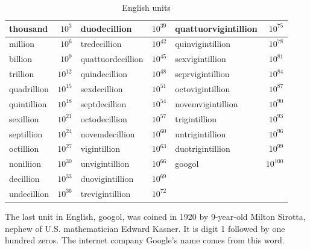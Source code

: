 \documentclass[b5paper]{article}
\begin{document}
\begin{table}[htbp]
  \centering
  \begin{tabular}{|l|r|l|r|l|r|}
  \hline
  thousand & $10^{3}$ & duodecillion  & $10^{39}$ & quattuorvigintillion & $10^{75}$ \\
  \hline
  million & $10^{6}$ & tredecillion  & $10^{42}$ & quinvigintillion & $10^{78}$ \\
  \hline
  billion & $10^{9}$ & quattuordecillion & $10^{45}$ & sexvigintillion & $10^{81}$ \\
  \hline
  trillion  & $10^{12}$ & quindecillion & $10^{48}$ & seprvigintillion & $10^{84}$ \\
  \hline
  quadrillion  & $10^{15}$ & sexdecillion & $10^{51}$ & octovigintillion & $10^{87}$ \\
  \hline
  quintillion  & $10^{18}$ & septdecillion & $10^{54}$ & novemvigintillion & $10^{90}$ \\
  \hline
  sexillion    & $10^{21}$ & octodecillion & $10^{57}$ & trigintillion & $10^{93}$ \\
  \hline
  septillion   & $10^{24}$ & novemdecillion & $10^{60}$ & untrigintillion & $10^{96}$ \\
  \hline
  octillion    & $10^{27}$ & vigintillion & $10^{63}$ & duotrigintillion & $10^{99}$  \\
  \hline
  noniliion  & $10^{30}$ & unvigintillion & $10^{66}$ & googol & $10^{100}$ \\
  \hline
  decillion  & $10^{33}$ & duovigintillion & $10^{69}$ & & \\
  \hline
  undecillion   & $10^{36}$ & trevigintillion & $10^{72}$ & & \\
  \hline
  \end{tabular}
  \caption{English units}
  \label{tab:units-en}
\end{table}

The last unit in English, googol, was coined in 1920 by 9-year-old Milton Sirotta, nephew of U.S. mathematician Edward Kasner. It is digit 1 followed by one hundred zeros. The internet company Google’s name comes from this word.
\end{document}
